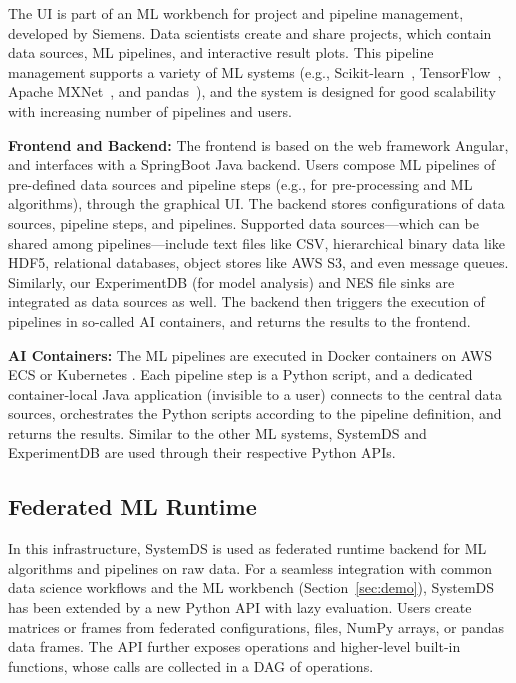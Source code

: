 \documentclass[sigconf,screen]{acmart}
\begin{document}
The UI is part of an ML workbench for project and pipeline management, developed by Siemens. Data scientists create and share projects, which contain data sources, ML pipelines, and interactive result plots. This pipeline management supports a variety of ML systems (e.g., Scikit-learn~\cite{PedregosaVGMTGBPWDVPCBPD11}, TensorFlow~\cite{AbadiBCCDDDGIIK16}, Apache MXNet~\cite{ChenLLLWWXXZZ15}, and pandas~\cite{mckinney-proc-scipy-2010}), and the system is designed for good scalability with increasing number of pipelines and users. 

\textbf{Frontend and Backend:} The frontend is based on the web framework Angular, and interfaces with a SpringBoot Java backend. Users compose ML pipelines of pre-defined data sources and pipeline steps (e.g., for pre-processing and ML algorithms), through the graphical UI. The backend stores configurations of data sources, pipeline steps, and pipelines. Supported data sources---which can be shared among pipelines---include text files like CSV, hierarchical binary data like HDF5, relational databases, object stores like AWS S3, and even message queues. Similarly, our ExperimentDB (for model analysis) and NES file sinks are integrated as data sources as well. The backend then triggers the execution of pipelines in so-called AI containers, and returns the results to the frontend.

\textbf{AI Containers:} The ML pipelines are executed in Docker containers on AWS ECS or Kubernetes \cite{BurnsGOBW16}. Each pipeline step is a Python script, and a dedicated container-local Java application (invisible to a user) connects to the central data sources, orchestrates the Python scripts according to the pipeline definition, and returns the results. Similar to the other ML systems, SystemDS and ExperimentDB are used through their respective Python APIs. 

\subsection{Federated ML Runtime}

In this infrastructure, SystemDS is used as federated runtime backend for ML algorithms and pipelines on raw data. For a seamless integration with common data science workflows and the ML workbench (Section~\ref{sec:demo}), SystemDS has been extended by a new Python API with lazy evaluation. Users create matrices or frames from federated configurations, files, NumPy arrays, or pandas data frames. The API further exposes operations and higher-level built-in functions, whose calls are collected in a DAG of operations. 
\end{document}
